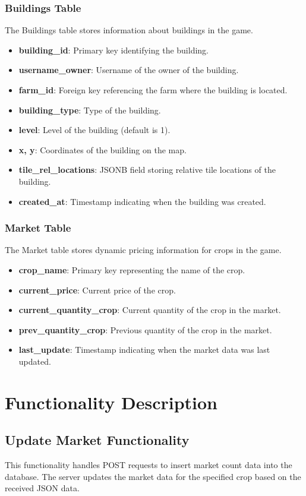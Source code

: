 \documentclass[12pt]{article}
\begin{document}
\subsubsection{Buildings Table}
The Buildings table stores information about buildings in the game.
\begin{itemize}
    \item \textbf{building\_id}: Primary key identifying the building.
    \item \textbf{username\_owner}: Username of the owner of the building.
    \item \textbf{farm\_id}: Foreign key referencing the farm where the building is located.
    \item \textbf{building\_type}: Type of the building.
    \item \textbf{level}: Level of the building (default is 1).
    \item \textbf{x, y}: Coordinates of the building on the map.
    \item \textbf{tile\_rel\_locations}: JSONB field storing relative tile locations of the building.
    \item \textbf{created\_at}: Timestamp indicating when the building was created.
\end{itemize}

\subsubsection{Market Table}
The Market table stores dynamic pricing information for crops in the game.
\begin{itemize}
    \item \textbf{crop\_name}: Primary key representing the name of the crop.
    \item \textbf{current\_price}: Current price of the crop.
    \item \textbf{current\_quantity\_crop}: Current quantity of the crop in the market.
    \item \textbf{prev\_quantity\_crop}: Previous quantity of the crop in the market.
    \item \textbf{last\_update}: Timestamp indicating when the market data was last updated.
\end{itemize}

\section{Functionality Description}
\subsection{Update Market Functionality}
This functionality handles POST requests to insert market count data into the database. The server updates the market data for the specified crop based on the received JSON data.
\end{document}
